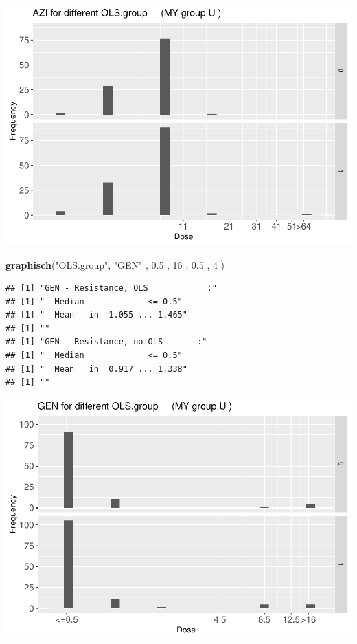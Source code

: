 \documentclass[
]{article}
\newenvironment{Shaded}{\begin{snugshade}}{\end{snugshade}}
\newcommand{\DecValTok}[1]{\textcolor[rgb]{0.00,0.00,0.81}{#1}}
\newcommand{\FloatTok}[1]{\textcolor[rgb]{0.00,0.00,0.81}{#1}}
\newcommand{\KeywordTok}[1]{\textcolor[rgb]{0.13,0.29,0.53}{\textbf{#1}}}
\newcommand{\NormalTok}[1]{#1}
\newcommand{\StringTok}[1]{\textcolor[rgb]{0.31,0.60,0.02}{#1}}
\begin{document}
\includegraphics{Verteilungen_files/figure-latex/unnamed-chunk-21-1.pdf}

\begin{Shaded}
\begin{Highlighting}[]
  \KeywordTok{graphisch}\NormalTok{(}\StringTok{"OLS.group"}\NormalTok{, }\StringTok{"GEN"}\NormalTok{ , }\FloatTok{0.5}\NormalTok{  ,  }\DecValTok{16}\NormalTok{   ,   }\FloatTok{0.5}\NormalTok{  ,   }\DecValTok{4}\NormalTok{    )}
\end{Highlighting}
\end{Shaded}

\begin{verbatim}
## [1] "GEN - Resistance, OLS            :"
## [1] "  Median             <= 0.5"
## [1] "  Mean   in  1.055 ... 1.465"
## [1] ""
## [1] "GEN - Resistance, no OLS       :"
## [1] "  Median             <= 0.5"
## [1] "  Mean   in  0.917 ... 1.338"
## [1] ""
\end{verbatim}

\includegraphics{Verteilungen_files/figure-latex/unnamed-chunk-22-1.pdf}
\end{document}
